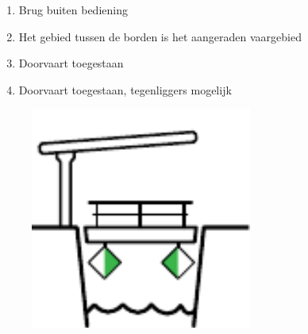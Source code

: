 \begin{figure}[H]	
	\vspace{-10px}
	\begin{minipage}[]{0.70\textwidth}
		\begin{enumerate}[topsep=0pt, label=\Alph*.]
			\item Brug buiten bediening
			\item Het gebied tussen de borden is het aangeraden vaargebied
			\item Doorvaart toegestaan
			\item Doorvaart toegestaan, tegenliggers mogelijk
		\end{enumerate}
	\end{minipage}
	\begin{minipage}[]{0.29\textwidth}
		\begin{figure}[H]
			\includegraphics[width=0.80\textwidth,right]{Hoofdstukken/Bruggen/pdf/brug_aanbevolen_gebied.pdf}
		\end{figure}
	\end{minipage}
	\vspace{-10px}
\end{figure}


